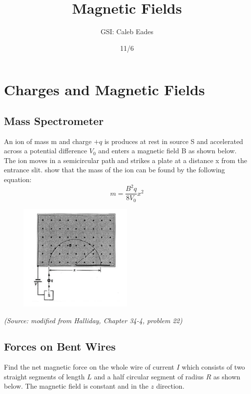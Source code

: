 \documentclass{article}
\begin{document}
\title{Magnetic Fields}
\author{GSI: Caleb Eades}
\date{11/6}
\maketitle

\section{Charges and Magnetic Fields}

\subsection{Mass Spectrometer}

An ion of mass m and charge $+q$ is produces at rest in source S and accelerated across a potential difference $V_0$ and enters a magnetic field B as shown below. The ion moves in a semicircular path and strikes a plate at a distance x from the entrance slit. show that the mass of the ion can be found by the following equation:
\begin{equation}
m=\frac{B^2q}{8V_0}x^2
\end{equation}

\begin{figure}[h]
\begin{center}
	\includegraphics[width=0.5\textwidth]{Spectrometer.png}
\end{center}
\end{figure}

\textit{(Source: modified from Halliday, Chapter 34-4, problem 22)}

\subsection{Forces on Bent Wires}

Find the net magnetic force on the whole wire of current $I$ which consists of two straight segments of length $L$ and a half circular segment of radius $R$ as shown below. The magnetic field is constant and in the $\hat{z}$ direction.
\end{document}
